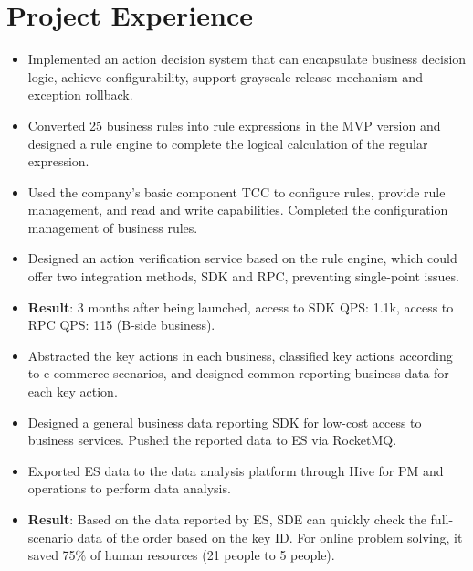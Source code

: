 \documentclass{resume}
\begin{document}
\section{Project Experience}
\begin{itemize}[parsep=0.2ex]
    \item Implemented an action decision system that can encapsulate business decision logic, achieve configurability, 
    support grayscale release mechanism and exception rollback.
    \item Converted 25 business rules into rule expressions in the MVP version and designed a rule engine to complete 
    the logical calculation of the regular expression.
    \item Used the company's basic component TCC to configure rules, provide rule management, and read and write 
    capabilities. Completed the configuration management of business rules.
    \item Designed an action verification service based on the rule engine, which could offer two integration methods, 
    SDK and RPC, preventing single-point issues.
    \item \textbf{Result}: 3 months after being launched, access to SDK QPS: 1.1k, access to RPC QPS: 115 (B-side business).
\end{itemize}

\begin{itemize}[parsep=0.2ex]
    \item Abstracted the key actions in each business, classified key actions according to e-commerce scenarios, and designed 
    common reporting business data for each key action.
    \item Designed a general business data reporting SDK for low-cost access to business services. Pushed the reported data 
    to ES via RocketMQ.
    \item Exported ES data to the data analysis platform through Hive for PM and operations to perform data analysis.
    \item \textbf{Result}: Based on the data reported by ES, SDE can quickly check the full-scenario data of the order based 
    on the key ID. For online problem solving, it saved 75\% of human resources (21 people to 5 people).
\end{itemize}
\end{document}
